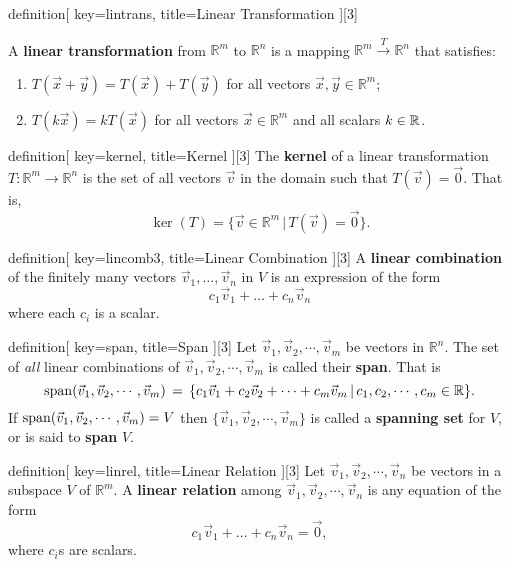 \begin{SaveConcept}{definition}[
		key=lintrans,
		title={Linear Transformation}
	][3]

	A {\bf linear transformation} from $\mathbb R^m$ to $\mathbb R^n$ is a mapping $\mathbb R^m \overset{T}\longrightarrow \mathbb R^n$  that satisfies:
	\begin{enumerate}
		\item $T(\vec x + \vec y) = T(\vec x) + T (\vec y)$ for all vectors $\vec x, \vec y \in \mathbb R^m$;
		\item $ T(k \vec x) = k T(\vec x)$ for all vectors $\vec x \in \mathbb R^m$ and all scalars $k\in\mathbb{R}$.
	\end{enumerate}
\end{SaveConcept}


\begin{SaveConcept}{definition}[
		key=kernel,
		title={Kernel}
	][3]
	The {\bf kernel} of a linear transformation $T:\mathbb R^m \longrightarrow \mathbb R^n$  is the set of all vectors $\vec v$ in the domain such that $T(\vec v) = \vec 0$. That is, 
        $$ 
        \ker(T) = \{ \vec v \in \mathbb R^m \, | \, T(\vec v) = \vec 0\}.
        $$
\end{SaveConcept}


\begin{SaveConcept}{definition}[
		key=lincomb3,
		title={Linear Combination}
	][3]
	A {\bf linear combination} of the finitely many vectors $\vec v_1, \dots, \vec v_n$ in $V$ is an expression of the form 
        $$
        c_1 \vec v_1 + \dots + c_n \vec v_n
        $$
        where each $c_i$ is a scalar. 
\end{SaveConcept}


\begin{SaveConcept}{definition}[
		key=span,
		title={Span}
	][3]
        Let $\vec v_1, \vec v_2,\cdots, \vec v_m$ be vectors in $\mathbb R^n$. The set of {\it all} linear combinations of $\vec v_1, \vec v_2,\cdots, \vec v_m$ is called their \textbf{span}. That is 
        \[
         \operatorname{span}(\vec v_1, \vec v_2,\cdots, \vec v_m) \, = \, \{ c_1 \vec v_1 + c_2 \vec v_2 + \dots + c_m \vec v_m \, | \, c_1, c_2,\cdots,c_m \in \mathbb{R}\}.
        \]
       If $\operatorname{span}(\vec v_1, \vec v_2,\cdots, \vec v_m)=V$ then $\{\vec v_1, \vec v_2,\cdots, \vec v_m\}$ is called a \textbf{spanning set} for $V$, or is said to \textbf{span} $V$.
\end{SaveConcept}

\begin{SaveConcept}{definition}[
		key=linrel,
		title={Linear Relation}
	][3]
        Let $\vec v_1, \vec v_2, \cdots ,\vec v_n$ be vectors in a subspace $V$ of $\mathbb R^m$. A {\bf linear relation} among $\vec v_1, \vec v_2, \cdots ,\vec v_n$ is any equation of the form 
        $$
        c_1 \vec v_1  +  \dots + c_n \vec v_n = \vec{0},
        $$
        where $c_i$s are scalars.
\end{SaveConcept}

